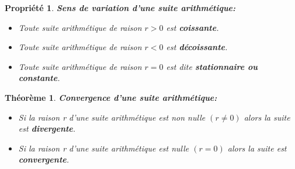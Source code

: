 \documentclass[a4paper, 12pt]{report}
\newtheorem{theoreme}{Théorème}[section]
\newtheorem{propriete}{Propriété}[section]
\begin{document}
        \begin{propriete}  \textbf{Sens de variation d'une suite arithmétique:}
            \begin{itemize}
                \item Toute suite arithmétique de raison $r>0$ est \textbf{coissante}.
                \item Toute suite arithmétique de raison $r<0$ est \textbf{décoissante}.
                \item Toute suite arithmétique de raison $r=0$ est dite \textbf{stationnaire ou constante}.
            \end{itemize}
        \end{propriete}
        \begin{theoreme}
            \textbf{Convergence d'une suite arithmétique:}
            \begin{itemize}
                \item Si la raison r d'une suite arithmétique est non nulle $(r\neq 0)$ alors la suite est \textbf{divergente}.
                \item Si la raison r d'une suite arithmétique est nulle $(r= 0)$ alors la suite est \textbf{convergente}.
            \end{itemize}
        \end{theoreme}
\end{document}
